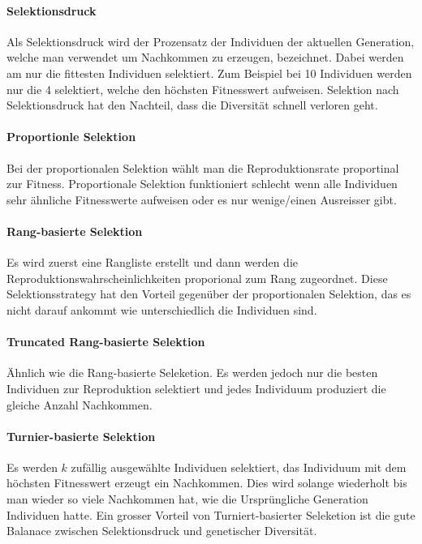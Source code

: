       \paragraph{Selektionsdruck}
        Als Selektionsdruck wird der Prozensatz der Individuen der aktuellen Generation, welche man verwendet um Nachkommen zu erzeugen, bezeichnet.
        Dabei werden am nur die fittesten Individuen selektiert. Zum Beispiel bei 10 Individuen werden nur die 4 selektiert, welche den höchsten Fitnesswert aufweisen.
        Selektion nach Selektionsdruck hat den Nachteil, dass die Diversität schnell verloren geht.

      \paragraph{Proportionle Selektion}
        Bei der proportionalen Selektion wählt man die Reproduktionsrate proportinal zur Fitness.
        Proportionale Selektion funktioniert schlecht wenn alle Individuen sehr ähnliche Fitnesswerte aufweisen oder es nur wenige/einen Ausreisser gibt.

      \paragraph{Rang-basierte Selektion}
        Es wird zuerst eine Rangliste erstellt und dann werden die Reproduktionswahrscheinlichkeiten proporional zum Rang zugeordnet.
        Diese Selektionsstrategy hat den Vorteil gegenüber der proportionalen Selektion, das es nicht darauf ankommt wie unterschiedlich die Individuen sind.

      \paragraph{Truncated Rang-basierte Selektion}
        Ähnlich wie die Rang-basierte Seleketion. Es werden jedoch nur die besten Individuen zur Reproduktion selektiert und
        jedes Individuum produziert die gleiche Anzahl Nachkommen.

      \paragraph{Turnier-basierte Selektion}
        Es werden \(k\) zufällig ausgewählte Individuen selektiert, das Individuum mit dem höchsten Fitnesswert erzeugt ein Nachkommen. Dies wird solange wiederholt bis man wieder so viele Nachkommen hat,
        wie die Ursprüngliche Generation Individuen hatte. Ein grosser Vorteil von Turniert-basierter Seleketion ist die gute Balanace zwischen Selektionsdruck und genetischer Diversität.

